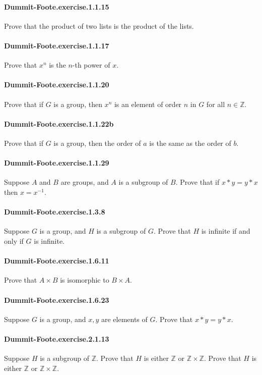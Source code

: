\documentclass{article}
\begin{document}
\paragraph{Dummit-Foote.exercise.1.1.15} Prove that the product of two lists is the product of the lists.

\paragraph{Dummit-Foote.exercise.1.1.17} Prove that $x^n$ is the $n$-th power of $x$.

\paragraph{Dummit-Foote.exercise.1.1.20} Prove that if $G$ is a group, then $x^n$ is an element of order $n$ in $G$ for all $n \in \mathbb{Z}$.

\paragraph{Dummit-Foote.exercise.1.1.22b} Prove that if $G$ is a group, then the order of $a$ is the same as the order of $b$.

\paragraph{Dummit-Foote.exercise.1.1.29} Suppose $A$ and $B$ are groups, and $A$ is a subgroup of $B$. Prove that if $x*y = y*x$ then $x = x^{-1}$.

\paragraph{Dummit-Foote.exercise.1.3.8} Suppose $G$ is a group, and $H$ is a subgroup of $G$. Prove that $H$ is infinite if and only if $G$ is infinite.

\paragraph{Dummit-Foote.exercise.1.6.11} Prove that $A × B$ is isomorphic to $B × A$.

\paragraph{Dummit-Foote.exercise.1.6.23} Suppose $G$ is a group, and $x, y$ are elements of $G$. Prove that $x*y = y*x$.

\paragraph{Dummit-Foote.exercise.2.1.13} Suppose $H$ is a subgroup of $\mathbb{Z}$. Prove that $H$ is either $\mathbb{Z}$ or $\mathbb{Z} \times \mathbb{Z}$. Prove that $H$ is either $\mathbb{Z}$ or $\mathbb{Z} \times \mathbb{Z}$.
\end{document}
